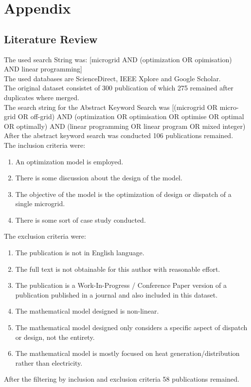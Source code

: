 \documentclass[
	11pt,								%
	DIV10,								%
	a4paper,         					%
	oneside,							%
	headheight=20pt,					%
	footheight=20pt,					%
    parskip=full,						%
    listof=totoc,						%
	bibliography=totoc,					%
	index=totoc,						%
]{scrartcl}
\begin{document}
\section{Appendix}
\subsection{Literature Review}
The used search String was:  [microgrid AND (optimization OR opimisation) AND linear programming]
\\
The used databases are ScienceDirect, IEEE Xplore and Google Scholar.
\\
The original dataset consistet of 300 publication of which 275 remained after duplicates where merged.
\\
The search string for the Abstract Keyword Search was [(microgrid OR micro-grid OR off-grid) AND (optimization OR optimisation OR optimise OR optimal OR optimally) AND (linear programming OR linear program OR mixed integer)
\\
After the abstract keyword search was conducted 106 publications remained.
\\
The inclusion criteria were:
\begin{enumerate}
	\item An optimization model is employed.
	\item There is some discussion about the design of the model.
	\item The objective of the model is the optimization of design or dispatch of a single microgrid.
	\item There is some sort of case study conducted.
\end{enumerate}
The exclusion criteria were:
\begin{enumerate}
	\item The publication is not in English language.
	\item The full text is not obtainable for this author with reasonable effort.
	\item The publication is a Work-In-Progress / Conference Paper version of a publication published in a journal and also included in this dataset.
	\item The mathematical model designed is non-linear.
	\item The mathematical model designed only considers a specific aspect of dispatch or design, not the entirety.
	\item The mathematical model is mostly focused on heat generation/distribution rather than electricity.
\end{enumerate}
After the filtering by inclusion and exclusion criteria 58 publications remained.


\newpage								%
\renewcommand\refname{Literature}			%
\printbibliography
\end{document}
